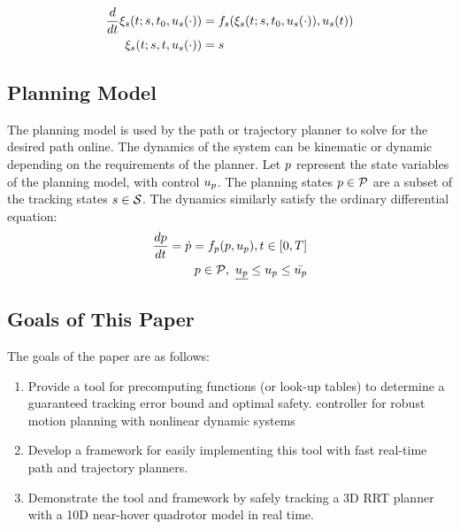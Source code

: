 \begin{equation}
\label{eq:fdyn_traj}
\begin{aligned}
\frac{d}{dt}\xi_{s}(t; s, t_0, u_s(\cdot)) &= f_s(\xi_{s}(t; s, t_0, u_s(\cdot)), u_s(t)) \\
\xi_{s}(t; s, t, u_s(\cdot)) &= s
\end{aligned}
\end{equation}

\subsection{Planning Model}
The planning model is used by the path or trajectory planner to solve for the desired path online. The dynamics of the system can be kinematic or dynamic depending on the requirements of the planner. Let $p$ represent the state variables of the planning model, with control $u_p$. The planning states $p \in \mathcal{P}$ are a subset of the tracking states $s \in \mathcal{S}$. The dynamics similarly satisfy the ordinary differential equation:
\begin{equation}
\begin{aligned}
\label{eq:pdyn}
\frac{dp}{dt} = \dot{p} = f_p(p, u_p), t \in [0, T] \\
p \in \mathcal{P}, \ \underline{u_p} \leq u_p \leq \bar{u_p}
\end{aligned}
\end{equation}
\subsection{Goals of This Paper}
The goals of the paper are as follows:
\begin{enumerate}
	\item Provide a tool for precomputing functions (or look-up tables) to determine a guaranteed tracking error bound and optimal safety. controller for robust motion planning with nonlinear dynamic systems
	\item Develop a framework for easily implementing this tool with fast real-time path and trajectory planners.
	\item Demonstrate the tool and framework by safely tracking a 3D RRT planner with a 10D near-hover quadrotor model in real time.
\end{enumerate}
